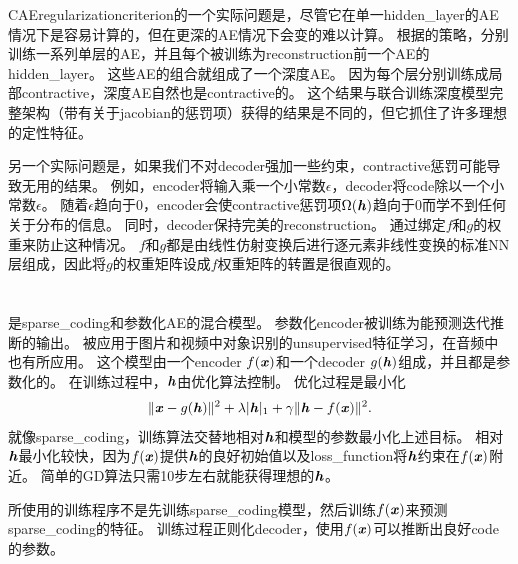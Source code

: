 \gls{CAE}\gls{regularization}\gls{criterion}的一个实际问题是，尽管它在单一\gls{hidden_layer}的\gls{AE}情况下是容易计算的，但在更深的\gls{AE}情况下会变的难以计算。
根据\citet{Rifai+al-2011-small}的策略，分别训练一系列单层的\gls{AE}，并且每个被训练为\gls{reconstruction}前一个\gls{AE}的\gls{hidden_layer}。
这些\gls{AE}的组合就组成了一个深度\gls{AE}。
因为每个层分别训练成局部\gls{contractive}，深度\gls{AE}自然也是\gls{contractive}的。
这个结果与联合训练深度模型完整架构（带有关于\gls{jacobian}的惩罚项）获得的结果是不同的，但它抓住了许多理想的定性特征。


另一个实际问题是，如果我们不对\gls{decoder}强加一些约束，\gls{contractive}惩罚可能导致无用的结果。
例如，\gls{encoder}将输入乘一个小常数$\epsilon$，\gls{decoder}将\gls{code}除以一个小常数$\epsilon$。
随着$\epsilon$趋向于0，\gls{encoder}会使\gls{contractive}惩罚项$\Omega(\boldsymbol{\mathit{h}})$趋向于0而学不到任何关于分布的信息。
同时，\gls{decoder}保持完美的\gls{reconstruction}。
\citet{Rifai+al-2011-small}通过绑定$f$和$g$的权重来防止这种情况。
$f$和$g$都是由线性仿射变换后进行逐元素非线性变换的标准\gls{NN}层组成，因此将$g$的权重矩阵设成$f$权重矩阵的转置是很直观的。


\section{}
\label{sec:predictive_sparse_decomposition}

是\gls{sparse_coding}和参数化\gls{AE}\citep{koray-psd-08}的混合模型。
参数化\gls{encoder}被训练为能预测迭代推断的输出。
被应用于图片和视频中对象识别的\gls{unsupervised}特征学习\citep{Koray-08-small,koray-nips-10-small,Jarrett-ICCV2009-small,farabet-suml-11}，在音频中也有所应用\citep{henaff-ismir-11-small}。
这个模型由一个\gls{encoder} $f(\boldsymbol{\mathit{x}})$和一个\gls{decoder} $g(\boldsymbol{\mathit{h}})$组成，并且都是参数化的。
在训练过程中，$\boldsymbol{\mathit{h}}$由优化算法控制。
优化过程是最小化
\begin{align}
 \| \boldsymbol{\mathit{x}} - g(\boldsymbol{\mathit{h}}) \| ^2 + \lambda | \boldsymbol{\mathit{h}} |_1 + \gamma \| \boldsymbol{\mathit{h}} - f(\boldsymbol{\mathit{x}}) \|^2.
\end{align}
就像\gls{sparse_coding}，训练算法交替地相对$\boldsymbol{\mathit{h}}$和模型的参数最小化上述目标。
相对$\boldsymbol{\mathit{h}}$最小化较快，因为$f(\boldsymbol{\mathit{x}})$提供$\boldsymbol{\mathit{h}}$的良好初始值以及\gls{loss_function}将$\boldsymbol{\mathit{h}}$约束在$f(\boldsymbol{\mathit{x}})$附近。
简单的\gls{GD}算法只需10步左右就能获得理想的$\boldsymbol{\mathit{h}}$。


所使用的训练程序不是先训练\gls{sparse_coding}模型，然后训练$f(\boldsymbol{\mathit{x}})$来预测\gls{sparse_coding}的特征。
训练过程正则化\gls{decoder}，使用$f(\boldsymbol{\mathit{x}})$可以推断出良好\gls{code}的参数。


